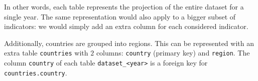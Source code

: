 In other words, each table represents the projection of the entire dataset for a single year.
The same representation would also apply to a bigger subset of indicators: we would simply add an extra column for each considered indicator.

Additionally, countries are grouped into regions.
This can be represented with an extra table \texttt{countries} with $2$ columns: \texttt{country} (primary key) and \texttt{region}.
The column \texttt{country} of each table \texttt{dataset\_<year>} is a foreign key for \texttt{countries.country}.

